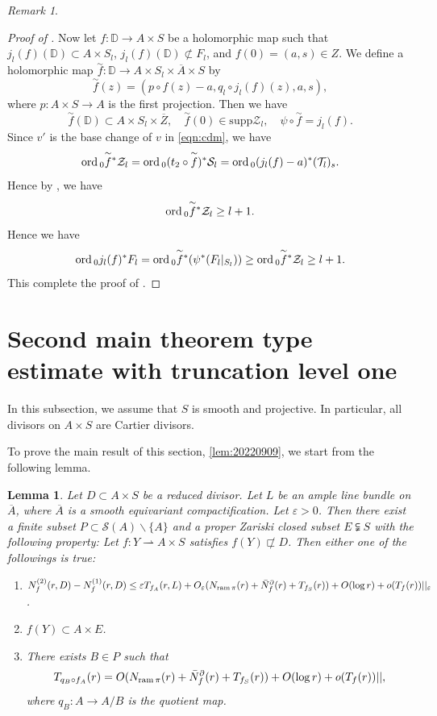 \documentclass[11pt,english]{smfart}
\theoremstyle{plain}
\newtheorem{lem}[thm]{Lemma}
\theoremstyle{definition}
\theoremstyle{remark}
\newtheorem{rem}[thm]{Remark}
\numberwithin{equation}{section}
\theoremstyle{plain}
\newcommand{\da}{\rightharpoonup}
\newcommand{\pN}[1]{\bar{N}_{#1}^{\partial}}
\newcommand{\ord}{{\rm ord}\,}
\newcommand{\ram}{{\rm ram}\,}
\begin{document}
\begin{rem}
\begin{proof}[Proof of  ]
Now let $f:\mathbb D \to A\times S$ be a holomorphic map such that $j_l(f)(\mathbb D )\subset A\times S_l$, $j_l(f)(\mathbb D )\not\subset F_l$, and $f(0)=(a,s)\in Z$.
We define a holomorphic map $\overset{\sim}{f}:\mathbb D \to A\times S_l\times \overline{A}\times S$ by
$$\overset{\sim}{f}(z)=(p\circ f(z)-a,q _l \circ j_{l}(f)(z),a,s),$$
where $p:A\times S\to A$ is the first projection.
Then we have
$$\overset{\sim}{f}(\mathbb D )\subset A\times S_l\times \overline{Z}, \quad  \overset{\sim}{f}(0)\in \mathrm{supp} \mathcal{Z}_l, \quad  \psi \circ \overset{\sim}{f}=j_{l}(f).$$
Since $v'$ is the base change of $v$ in \eqref{eqn:cdm}, we have
$$\ord _{0}\overset{\sim}{f} {}^*\mathcal{Z}_{l}=\ord _{0}(t_2\circ \overset{\sim}{f})^*\mathcal{S}_l
=\ord _{0}(j_{l}(f)-a)^*(\mathcal{T}_{l})_s.
$$
Hence by \cite[Lemma 6 (2)]{Yam15}, we have
$$\ord _{0}\overset{\sim}{f} {}^*\mathcal{Z}_{l}\geq l+1.$$
Hence we have
$$\ord _{0}j_{l}(f)^*F_l=
\ord _{0}\overset{\sim}{f} {}^*(\psi ^{*}(F_l|_{S_l}))\geq \ord _{0}\overset{\sim}{f} {}^*\mathcal{Z}_{l}\geq l+1.$$
This complete the proof of .
\end{proof}
\end{rem}
	
	
	
	
	
	
	
	
	
	
	\section{Second main theorem type estimate with truncation level one}\label{subsec:4.7a}
	In this subsection, we assume that $S$ is smooth and projective.
	In particular, all divisors on $A\times S$ are Cartier divisors.
	
	To prove the main result of this section, \cref{lem:20220909}, we start from the following lemma.
	
	\begin{lem}\label{lem:20220915}
		Let $D\subset A\times S$ be a reduced divisor.
		Let $L$ be an ample line bundle on $\overline{A}$, where $\overline{A}$ is a smooth equivariant compactification. 	Let $\varepsilon>0$.
		Then there exist a finite subset $P\subset \mathcal{S}(A)\backslash\{A\}$ and a proper Zariski closed subset $E\subsetneqq S$ with the following property:
		Let $f:Y\da A\times S$ satisfies $f(Y)\not\sqsubset D$.
		Then either one of the followings is true:
		\begin{enumerate}
			\item
			$
			N^{(2)}_f(r,D)-N^{(1)}_f(r,D)\leq \varepsilon T_{f_A}(r,L)+O_{\varepsilon}(N_{\ram\pi}(r)+\pN{f}(r)
			+T_{f_S}(r))+O(\log r)+o(T_f(r))||_{\varepsilon}$.
			\item
			$f(Y)\subset A\times E$.
			\item
			There exists $B\in P$ such that 
			$$
			T_{q_B\circ f_A}(r)=O(N_{\ram\pi}(r)+\pN{f}(r)+T_{f_S}(r))+O(\log r)+o(T_f(r))||, 
			$$
			where $q_B:A\to A/B$ is the quotient map.
		\end{enumerate}
	\end{lem}
	
\end{document}
